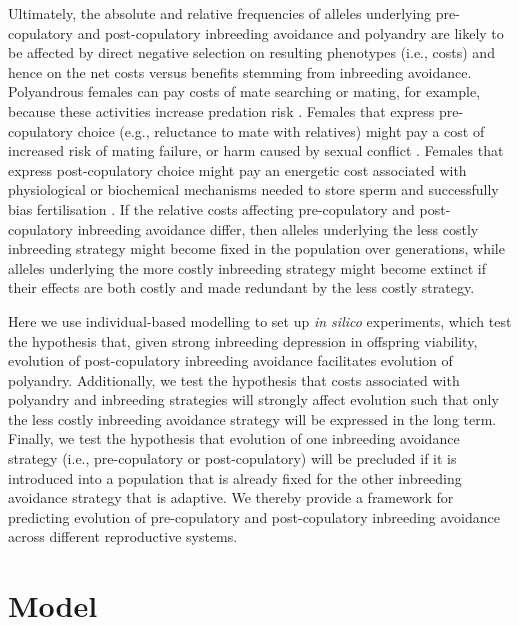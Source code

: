 \documentclass[10pt,letterpaper]{article}
\begin{document}
Ultimately, the absolute and relative frequencies of alleles underlying pre-copulatory and post-copulatory inbreeding avoidance and polyandry are likely to be affected by direct negative selection on resulting phenotypes (i.e., costs) and hence on the net costs versus benefits stemming from inbreeding avoidance. Polyandrous females can pay costs of mate searching or mating, for example, because these activities increase predation risk \cite[e.g.,][]{Rowe1988, Ronkainen1994, Koga1998}. Females that express pre-copulatory choice (e.g., reluctance to mate with relatives) might pay a cost of increased risk of mating failure, or harm caused by sexual conflict \cite[][]{Rowe1994, Kokko2013}. Females that express post-copulatory choice might pay an energetic cost associated with physiological or biochemical mechanisms needed to store sperm and successfully bias fertilisation \cite[e.g.,][]{Gasparini2011, Tuni2013, Fitzpatrick2014b}. If the relative costs affecting pre-copulatory and post-copulatory inbreeding avoidance differ, then alleles underlying the less costly inbreeding strategy might become fixed in the population over generations, while alleles underlying the more costly inbreeding strategy might become extinct if their effects are both costly and made redundant by the less costly strategy.

Here we use individual-based modelling to set up \textit{in silico} experiments, which test the hypothesis that, given strong inbreeding depression in offspring viability, evolution of post-copulatory inbreeding avoidance facilitates evolution of polyandry. Additionally, we test the hypothesis that costs associated with polyandry and inbreeding strategies will strongly affect evolution such that only the less costly inbreeding avoidance strategy will be expressed in the long term. Finally, we test the hypothesis that evolution of one inbreeding avoidance strategy (i.e., pre-copulatory or post-copulatory) will be precluded if it is introduced into a population that is already fixed for the other inbreeding avoidance strategy that is adaptive. We thereby provide a framework for predicting evolution of pre-copulatory and post-copulatory inbreeding avoidance across different reproductive systems.


\section*{Model}
\end{document}

